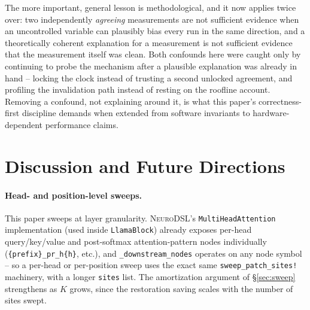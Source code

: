 \documentclass{article}
\begin{document}
The more important, general lesson is methodological, and it now applies twice over: two
independently \emph{agreeing} measurements are not sufficient evidence when an uncontrolled
variable can plausibly bias every run in the same direction, and a theoretically coherent
explanation for a measurement is not sufficient evidence that the measurement itself was clean.
Both confounds here were caught only by continuing to probe the mechanism after a plausible
explanation was already in hand -- locking the clock instead of trusting a second unlocked
agreement, and profiling the invalidation path instead of resting on the roofline account.
Removing a confound, not explaining around it, is what this paper's correctness-first discipline
demands when extended from software invariants to hardware-dependent performance claims.

\section{Discussion and Future Directions}
\label{sec:discussion}

\paragraph{Head- and position-level sweeps.} This paper sweeps at layer granularity.
\textsc{NeuroDSL}'s \texttt{MultiHeadAttention} implementation (used inside \texttt{LlamaBlock})
already exposes per-head query/key/value and post-softmax attention-pattern nodes individually
(\texttt{\{prefix\}\_pr\_h\{h\}}, etc.), and \texttt{\_downstream\_nodes} operates on any node
symbol -- so a per-head or per-position sweep uses the exact same
\texttt{sweep\_patch\_sites!} machinery, with a longer \texttt{sites} list. The amortization
argument of \S\ref{sec:sweep} strengthens as $K$ grows, since the restoration saving scales with
the number of sites swept.
\end{document}
